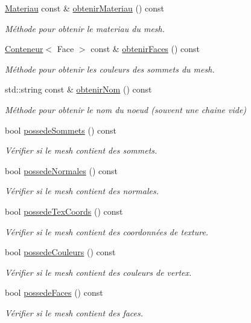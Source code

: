 \begin{DoxyCompactItemize}
\hyperlink{structmodele_1_1_materiau}{Materiau} const \& \hyperlink{classmodele_1_1_mesh_ae072a8706a2a057780de35b4fbed1d19}{obtenir\+Materiau} () const 
\begin{DoxyCompactList}\small\item\em Méthode pour obtenir le materiau du mesh. \end{DoxyCompactList}\item 
\hyperlink{classmodele_1_1_mesh_adbc8897d8cdca4541a2068c874aa54eb}{Conteneur}$<$ Face $>$ const \& \hyperlink{classmodele_1_1_mesh_afd06495e1e6d7e870baf7e20b7862b8d}{obtenir\+Faces} () const 
\begin{DoxyCompactList}\small\item\em Méthode pour obtenir les couleurs des sommets du mesh. \end{DoxyCompactList}\item 
std\+::string const \& \hyperlink{classmodele_1_1_mesh_ad04c281e59a74438cd0f6564743c537b}{obtenir\+Nom} () const 
\begin{DoxyCompactList}\small\item\em Méthode pour obtenir le nom du noeud (souvent une chaine vide) \end{DoxyCompactList}\item 
bool \hyperlink{classmodele_1_1_mesh_aa7ff98102f4e390cd15df6d919474ff8}{possede\+Sommets} () const 
\begin{DoxyCompactList}\small\item\em Vérifier si le mesh contient des sommets. \end{DoxyCompactList}\item 
bool \hyperlink{classmodele_1_1_mesh_aca6001ed3c4bd55f854a442e97ac5258}{possede\+Normales} () const 
\begin{DoxyCompactList}\small\item\em Vérifier si le mesh contient des normales. \end{DoxyCompactList}\item 
bool \hyperlink{classmodele_1_1_mesh_a0ed3db0114de7a7674f252a78b35cad8}{possede\+Tex\+Coords} () const 
\begin{DoxyCompactList}\small\item\em Vérifier si le mesh contient des coordonnées de texture. \end{DoxyCompactList}\item 
bool \hyperlink{classmodele_1_1_mesh_a3655f655ce525b4d7448050a2f6692af}{possede\+Couleurs} () const 
\begin{DoxyCompactList}\small\item\em Vérifier si le mesh contient des couleurs de vertex. \end{DoxyCompactList}\item 
bool \hyperlink{classmodele_1_1_mesh_a542042fa090ce91d6d1858c1be91c5b4}{possede\+Faces} () const 
\begin{DoxyCompactList}\small\item\em Vérifier si le mesh contient des faces. \end{DoxyCompactList}\end{DoxyCompactItemize}


